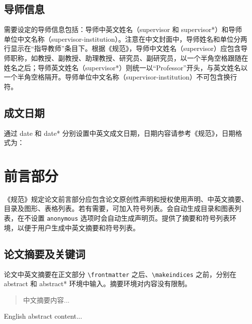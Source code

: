\documentclass[bachelor, comfort]{shtthesis}
\begin{document}
\subsection{导师信息}
需要设定的导师信息包括：导师中英文姓名（supervisor 和 supervisor*）和导师单位中文名称（supervisor-institution）。注意在中文封面中，导师姓名和单位分两行显示在“指导教师”条目下。根据《规范》，导师中文姓名（supervisor）应包含导师职称，如教授、副教授、助理教授、研究员、副研究员，以一个半角空格跟随在姓名之后；导师英文姓名（supervisor*）则统一以“Professor”开头，与英文姓名以一个半角空格隔开。导师单位中文名称（supervisor-institution）不可包含换行符。
\begin{latex}
\end{latex}

\subsection{成文日期}
通过 date 和 date* 分别设置中英文成文日期，日期内容请参考《规范》，日期格式为：
\begin{latex}
\end{latex}

\section{前言部分}
《规范》规定论文前言部分应包含论文原创性声明和授权使用声明、中英文摘要、目录及图形、表格列表。若有需要，可加入符号列表。\shtthesis 会自动生成目录和图表列表，在不设置 \verb|anonymous| 选项时会自动生成声明页。\shtthesis 提供了摘要和符号列表环境，以便于用户生成中英文摘要和符号列表。

\subsection{论文摘要及关键词}
论文中英文摘要在正文部分 \verb|\frontmatter| 之后、\verb|\makeindices| 之前，分别在 abstract 和 abstract* 环境中输入。摘要环境对内容没有限制。
\begin{latex}
\begin{abstract}
  中文摘要内容...
\end{abstract}

\begin{abstract*}
  English abstract content...
\end{abstract*}
\end{latex}
\end{document}
